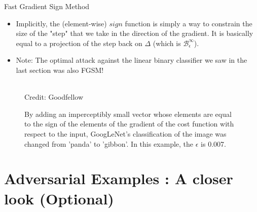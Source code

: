 \begin{vbframe} {Fast Gradient Sign Method}
\begin{itemize}
\begin{figure}
      \tiny{\\Credit: Kolter and Madry}
      \caption{$\deltab$ is obtained by setting each element of $\nabla_{\xv} L\left(y, \fh(\xv | \thetab) \right)$ to $-\epsilon$ or $\epsilon$ depending on its sign. Note that this slightly changes the direction of the step that is taken.}
  \end{figure}
        \item Implicitly, the (element-wise) $sign$ function is simply a way to constrain the size of the "step" that we take in the direction of the gradient. It is basically equal to a projection of the step back on $\Delta$ (which is $\mathcal{B}^{\infty}_{\epsilon}$).
        \end{itemize}
      \framebreak
        \begin{itemize}
           \item Note: The optimal attack against the linear binary classifier we saw in the last section was also FGSM!
            \end{itemize}
  \begin{figure}
    \centering
      \tiny{\\Credit: Goodfellow}
      \caption{\small{By adding an imperceptibly small vector whose elements are equal to the sign of the elements of the gradient of the cost function with respect to the input, GoogLeNet's classification of the image was changed from 'panda' to 'gibbon'. In this example, the $\epsilon$ is 0.007.}}
  \end{figure}
\end{vbframe}

\section{Adversarial Examples : A closer look (Optional)}

